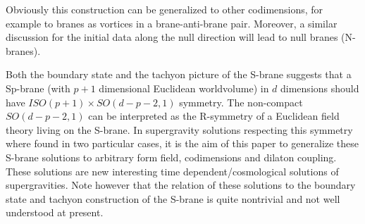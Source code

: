 \documentclass[a4paper,aps,nofootinbib,showpacs,preprint]{revtex4}
\begin{document}
Obviously this construction can be generalized to other
codimensions, for example to branes as vortices in a
brane-anti-brane pair. Moreover, a similar discussion for the
initial data along the null direction will lead to null branes
(N-branes).

Both the boundary state and the tachyon picture of the S-brane
suggests that a Sp-brane (with $p+1$ dimensional Euclidean
worldvolume) in $d$ dimensions should have $ISO(p+1) \times
SO(d-p-2,1)$ symmetry. The non-compact $SO(d-p-2,1)$ can be
interpreted as the R-symmetry of a Euclidean field theory living
on the S-brane. In \cite{GS02} supergravity solutions respecting
this symmetry where found in two particular cases, it is the aim
of this paper to generalize these S-brane solutions to arbitrary
form field, codimensions and dilaton coupling. These solutions are
new interesting time dependent/cosmological solutions of
supergravities. Note however that the relation of these solutions
to the boundary state and tachyon construction of the S-brane is
quite nontrivial and not well understood at present.


\end{document}
